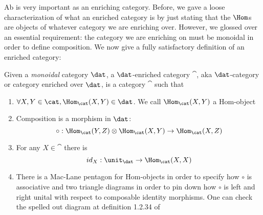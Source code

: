 Ab is very important as an enriching category. Before, we gave a loose characterization of what an
 enriched category is by just stating that the $\Hom$s are objects of whatever category we are
  enriching over. However, we glossed over an essential requirement: the category we are
   enriching on must be monoidal in order to define composition. We now give a fully satisfactory
    definition of an enriched category:
\begin{defn}\label{FullEnrichedCat}
    Given a \emph{monoidal} category $\dat$, a $\dat$-enriched category $\cat$, aka $\dat$-category or category enriched over $\dat$, is a category $\cat$ such that \begin{enumerate}
        \item $\forall X,Y\in\cat, \Hom_{\cat}(X,Y)\in\dat$. We call $\Hom_\cat(X,Y)$ a Hom-object
        \item Composition is a morphism in $\dat$: $$\circ:\Hom_\cat(Y,Z)\otimes \Hom_\cat(X,Y)\to\Hom_\cat(X,Z)$$ 
        \item For any $X\in\cat$ there is 
        $$id_X:\unit_\dat\to \Hom_\cat(X,X)$$
        \item There is a Mac-Lane pentagon for Hom-objects in order to specify how $\circ$ is associative and two triangle diagrams in order to pin down how $\circ$ is left and right unital with respect to composable identity morphisms. One can check the spelled out diagram at definition 1.2.34 of \cite{land2021introduction} 
    \end{enumerate}
\end{defn}
